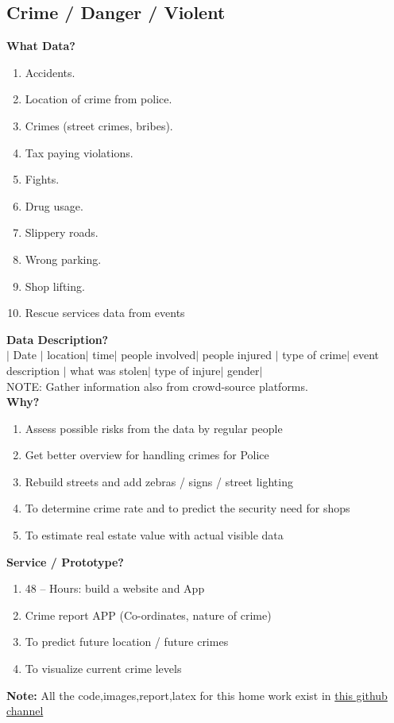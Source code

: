 \documentclass{article}
\begin{document}
\subsection*{\Large Crime / Danger / Violent}
\textbf{\large What Data?}
\begin{enumerate}
\item		Accidents.
\item		Location of crime from police.
\item		Crimes (street crimes, bribes).
\item 		Tax paying violations.
\item		Fights.
\item		Drug usage.
\item		Slippery roads.
\item		Wrong parking.
\item		Shop lifting.
\item		Rescue services data from events
\end{enumerate}
\textbf{\large Data Description?}\\
	\(|\) Date \(|\)  location\(|\)  time\(|\)  people involved\(|\)  people injured \(|\)  type of crime\(|\)  event description \(|\) what was stolen\(|\)  type of injure\(|\)  gender\(|\)  \\
	NOTE: Gather information also from crowd-source platforms.\\
	\textbf{\large Why?}
	\begin{enumerate}
\item			Assess possible risks from the data by regular people
\item			Get better overview for handling crimes for Police
\item			Rebuild streets and add zebras / signs / street lighting
\item			To determine crime rate and to predict the security need for shops
\item			To estimate real estate value with actual visible data
	\end{enumerate}

	\textbf{\large Service / Prototype?}	
	\begin{enumerate}
\item	48 – Hours: build a website and App
\item	Crime report APP (Co-ordinates, nature of crime)
\item	To predict future location / future crimes
\item	To visualize current crime levels
	\end{enumerate}

\textbf{\Large Note:} All the code,images,report,latex for this home work exist in \href{https://github.com/aqeel13932/DM/tree/master/HW04}{this github channel}
\end{document}

